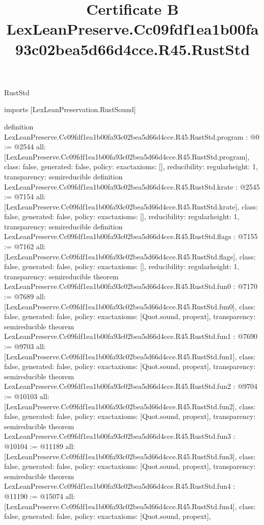 \begin{lexlean}{RustStd}
\title{Certificate B LexLeanPreserve.Cc09fdf1ea1b00fa93c02bea5d66d4cce.R45.RustStd}
\begin{coremodule}
imports [LexLeanPreservation.RustSound]

definition LexLeanPreserve.Cc09fdf1ea1b00fa93c02bea5d66d4cce.R45.RustStd.program : @0 := @2544 {
  all: [LexLeanPreserve.Cc09fdf1ea1b00fa93c02bea5d66d4cce.R45.RustStd.program],
  class: false,
  generated: false,
  policy: exact{axioms: []},
  reducibility: regular{height: 1},
  transparency: semireducible
}
definition LexLeanPreserve.Cc09fdf1ea1b00fa93c02bea5d66d4cce.R45.RustStd.krate : @2545 := @7154 {
  all: [LexLeanPreserve.Cc09fdf1ea1b00fa93c02bea5d66d4cce.R45.RustStd.krate],
  class: false,
  generated: false,
  policy: exact{axioms: []},
  reducibility: regular{height: 1},
  transparency: semireducible
}
definition LexLeanPreserve.Cc09fdf1ea1b00fa93c02bea5d66d4cce.R45.RustStd.flags : @7155 := @7162 {
  all: [LexLeanPreserve.Cc09fdf1ea1b00fa93c02bea5d66d4cce.R45.RustStd.flags],
  class: false,
  generated: false,
  policy: exact{axioms: []},
  reducibility: regular{height: 1},
  transparency: semireducible
}
theorem LexLeanPreserve.Cc09fdf1ea1b00fa93c02bea5d66d4cce.R45.RustStd.fun0 : @7170 := @7689 {
  all: [LexLeanPreserve.Cc09fdf1ea1b00fa93c02bea5d66d4cce.R45.RustStd.fun0],
  class: false,
  generated: false,
  policy: exact{axioms: [Quot.sound, propext]},
  transparency: semireducible
}
theorem LexLeanPreserve.Cc09fdf1ea1b00fa93c02bea5d66d4cce.R45.RustStd.fun1 : @7690 := @9703 {
  all: [LexLeanPreserve.Cc09fdf1ea1b00fa93c02bea5d66d4cce.R45.RustStd.fun1],
  class: false,
  generated: false,
  policy: exact{axioms: [Quot.sound, propext]},
  transparency: semireducible
}
theorem LexLeanPreserve.Cc09fdf1ea1b00fa93c02bea5d66d4cce.R45.RustStd.fun2 : @9704 := @10103 {
  all: [LexLeanPreserve.Cc09fdf1ea1b00fa93c02bea5d66d4cce.R45.RustStd.fun2],
  class: false,
  generated: false,
  policy: exact{axioms: [Quot.sound, propext]},
  transparency: semireducible
}
theorem LexLeanPreserve.Cc09fdf1ea1b00fa93c02bea5d66d4cce.R45.RustStd.fun3 : @10104 := @11189 {
  all: [LexLeanPreserve.Cc09fdf1ea1b00fa93c02bea5d66d4cce.R45.RustStd.fun3],
  class: false,
  generated: false,
  policy: exact{axioms: [Quot.sound, propext]},
  transparency: semireducible
}
theorem LexLeanPreserve.Cc09fdf1ea1b00fa93c02bea5d66d4cce.R45.RustStd.fun4 : @11190 := @15074 {
  all: [LexLeanPreserve.Cc09fdf1ea1b00fa93c02bea5d66d4cce.R45.RustStd.fun4],
  class: false,
  generated: false,
  policy: exact{axioms: [Quot.sound, propext]},
}
\end{coremodule}
\end{lexlean}
